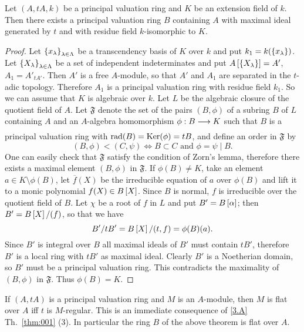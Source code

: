 \documentclass[../main]{subfiles}
\begin{document}
\begin{theorem}
\label{thm:083}
    Let $(A,tA,k)$ be a principal valuation ring and $K$ be an extension field of $k$. Then there exists a principal valuation ring $B$ containing $A$ with maximal ideal generated by $t$ and with residue field $k$-isomorphic to $K$. 
\end{theorem}
\begin{proof}
    Let $\left\{x_\lambda\right\}_{\lambda\in\Lambda}$ be a transcendency basis of $K$ over $k$ and put $k_1 = k(\left\{x_\lambda\right\})$. Let $\left\{X_\lambda\right\}_{\lambda\in\Lambda}$ be a set of independent indeterminates and put $A\left[\left\{X_\lambda\right\}\right]=A'$, $A_1 = A'_{tA'}$. Then $A'$ is a free $A$-module, so that $A'$ and $A_1$ are separated in the $t$-adic topology. Therefore $A_1$ is a principal valuation ring with residue field $k_1$. So we can assume that $K$ is algebraic over $k$. Let $L$ be the algebraic closure of the quotient field of $A$. Let $\mathfrak{F}$ denote the set of the pairs $(B,\phi)$ of a subring $B$ of $L$ containing $A$ and an $A$-algebra homomorphism $\phi: B \varrightarrow{} K$ such that $B$ is a principal valuation ring with $\operatorname{rad}(B) = \operatorname{Ker}(\phi) = tB$, and define an order in $\mathfrak{F}$ by \[(B,\phi) < (C, \psi) \iff B\subset C \text{ and } \phi = \psi\mid B.\] One can easily check that $\mathfrak{F}$ satisfy the condition of Zorn's lemma, therefore there exists a maximal element $(B,\phi)$ in $\mathfrak{F}$. If $\phi(B) \neq K$, take an element $a \in K\setminus\phi(B)$, let $\overline{f}(X)$ be the irreducible equation of $a$ over $\phi(B)$ and lift it to a monic polynomial $f(X) \in B\left[X\right]$. Since $B$ is normal, $f$ is irreducible over the quotient field of $B$. Let $\chi$ be a root of $f$ in $L$ and put $B' = B\left[\alpha\right]$; then $B' = B\left[X\right]/(f)$, so that we have \[B'/tB' = B\left[X\right]/(t,f) = \phi(B)(a).\] Since $B'$ is integral over $B$ all maximal ideals of $B'$ must contain $tB'$, therefore $B'$ is a local ring with $tB'$ as maximal ideal. Clearly $B'$ is a Noetherian domain, so $B'$ must be a principal valuation ring. This contradicts the maximality of $(B,\phi)$ in $\mathfrak{F}$. Thus $\phi(B) = K$. 
\end{proof}
\begin{remark}
\label{rem:37.01}
    If $(A, tA)$ is a principal valuation ring and $M$ is an $A$-module, then $M$ is flat over $A$ iff $t$ is $M$-regular. This is an immediate consequence of \ref{3.A} Th.~\ref{thm:001} (3). In particular the ring $B$ of the above theorem is flat over $A$. 
\end{remark}
\end{document}
